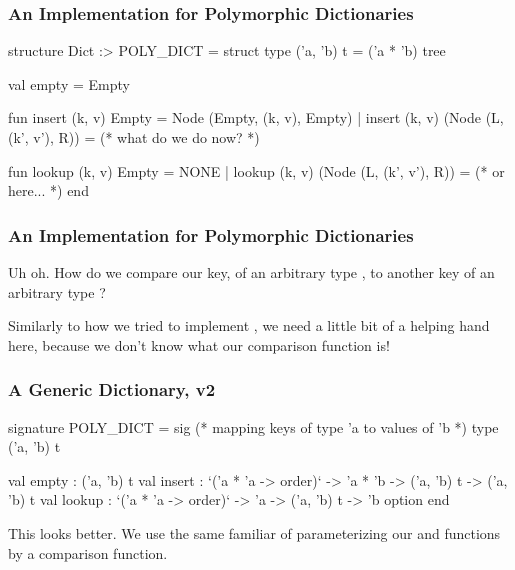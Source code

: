 \documentclass[aspectratio=169]{beamer}
\begin{document}
\begin{frame}[fragile]
  \frametitle{An Implementation for Polymorphic Dictionaries}

  { \small
  \begin{codeblock}
    structure Dict :> POLY_DICT =
      struct
        type ('a, 'b) t = ('a * 'b) tree

        val empty = Empty

        fun insert (k, v) Empty = Node (Empty, (k, v), Empty)
          | insert (k, v) (Node (L, (k', v'), R)) =
              (* what do we do now? *)

        fun lookup (k, v) Empty = NONE
          | lookup (k, v) (Node (L, (k', v'), R)) =
              (* or here... *)
    end
  \end{codeblock}
  }

\end{frame}

\begin{frame}[fragile]
  \frametitle{An Implementation for Polymorphic Dictionaries}

  Uh oh. How do we compare our key, of an arbitrary type , to
  another key of an arbitrary type ?\footnotemark

  \pause
  \vspace{\fill}

  Similarly to how we tried to implement ,
  we need a little bit of a helping hand here, because we don't know what
  our comparison function is!

\end{frame}

\begin{frame}[fragile]
  \frametitle{A Generic Dictionary, v2}

  {\small
  \begin{codeblock}
    signature POLY_DICT =
      sig
        (* mapping keys of type 'a to values of 'b *)
        type ('a, 'b) t

        val empty : ('a, 'b) t
        val insert :
          `('a * 'a -> order)` -> 'a * 'b -> ('a, 'b) t -> ('a, 'b) t
        val lookup :
          `('a * 'a -> order)` -> 'a -> ('a, 'b) t -> 'b option
      end
  \end{codeblock}
  }

  \pause
  \vspace{\fill}

  This looks better. We use the same familiar of parameterizing our
   and  functions by a comparison function.
\end{frame}
\end{document}
